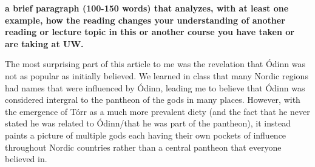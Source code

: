 \documentclass[a4paper]{article}
\begin{document}
        \textbf{a brief paragraph (100-150 words) that analyzes, with at least one example, how the reading changes your understanding of another reading or lecture topic in this or another course you have taken or are taking at UW.}

        The most surprising part of this article to me was the revelation that Ódinn was not as popular as initially believed. We learned 
        in class that many Nordic regions had names that were influenced by Ódinn, leading me to believe that Ódinn was considered intergral 
        to the pantheon of the gods in many places. However, with the emergence of Tórr as a much more prevalent diety (and the fact that 
        he never stated he was related to Ódinn/that he was part of the pantheon), it instead paints a picture of multiple gods each having 
        their own pockets of influence throughout Nordic countries rather than a central pantheon that everyone believed in. 

        \pagebreak
        
        
        \cite{TGunn}
\end{document}
